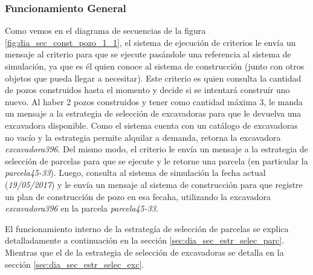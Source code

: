 \subsubsection{Funcionamiento General}
\par Como vemos en el diagrama de secuencias de la figura \ref{fig:dia_sec_const_pozo_1_1}, el sistema de ejecución de criterios le envía un mensaje al criterio para que se ejecute pasándole una referencia al sistema de simulación, ya que es él quien conoce al sistema de construcción (junto con otros objetos que pueda llegar a necesitar). Este criterio es quien consulta la cantidad de pozos construidos hasta el momento y decide si se intentará construír uno nuevo. Al haber 2 pozos construidos y tener como cantidad máxima 3, le manda un mensaje a la estrategia de selección de excavadoras para que le devuelva una excavadora disponible. Como el sistema cuenta con un catálogo de excavadoras no vacío y la estrategia permite alquilar a demanda, retorna la excavadora \textit{excavadora396}. Del mismo modo, el criterio le envía un mensaje a la estrategia de selección de parcelas para que se ejecute y le retorne una parcela (en particular la \textit{parcela45-33}). Luego, consulta al sistema de simulación la fecha actual (\textit{19/05/2017}) y le envía un mensaje al sistema de construcción para que registre un plan de construcción de pozo en esa fecaha, utilizando la excavadora \textit{excavadora396} en la parcela \textit{parcela45-33}.
\par El funcionamiento interno de la estrategía de selección de parcelas se explica detalladamente a continuación en la sección \ref{sec:dia_sec_estr_selec_parc}. Mientras que el de la estrategia de selección de excavadoras se detalla en la sección \ref{sec:dia_sec_estr_selec_exc}.

